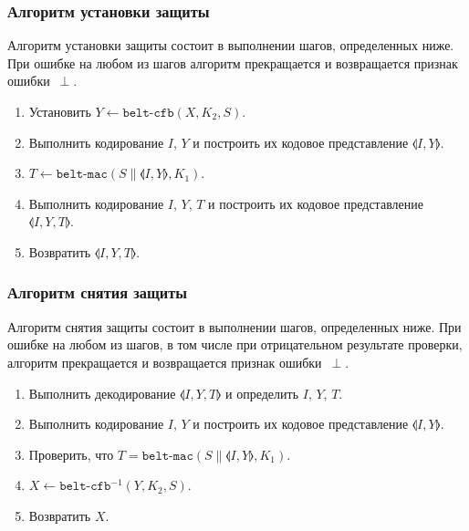 \subsubsection{Алгоритм установки защиты}
\label{CRYPTO.SM.Algs.Encr}

Алгоритм установки защиты состоит в выполнении шагов, определенных ниже.
При ошибке на любом из шагов алгоритм прекращается и возвращается признак 
ошибки~$\perp$.

\begin{enumerate}
\item
Установить $Y\gets\texttt{belt-cfb}(X, K_2, S)$.

\item
Выполнить кодирование $I$, $Y$ и построить их кодовое 
представление $\llangle I, Y\rrangle$.

\item
$T\gets\texttt{belt-mac}(S\parallel \llangle I, Y\rrangle, K_1)$.

\item
Выполнить кодирование $I$, $Y$, $T$ и построить их кодовое 
представление $\llangle I, Y, T \rrangle$.

\item
Возвратить $\llangle I, Y, T \rrangle$.
\end{enumerate}

\subsubsection{Алгоритм снятия защиты}
\label{CRYPTO.SM.Algs.Decr}

Алгоритм снятия защиты состоит в выполнении шагов, определенных ниже. При 
ошибке на любом из шагов, в том числе при отрицательном результате 
проверки, алгоритм прекращается и возвращается признак ошибки~$\perp$.

\begin{enumerate}
\item
Выполнить декодирование $\llangle I, Y, T \rrangle$ 
и определить $I$, $Y$, $T$.
 
\item
Выполнить кодирование $I$, $Y$ и построить их кодовое представление 
$\llangle I, Y \rrangle$.
 
\item
Проверить, 
что $T=\texttt{belt-mac}(S\parallel \llangle I, Y\rrangle, K_1)$.
 
\item
$X\leftarrow\texttt{belt-cfb}^{-1}(Y, K_2, S)$.
 
\item
Возвратить $X$.
\end{enumerate}

